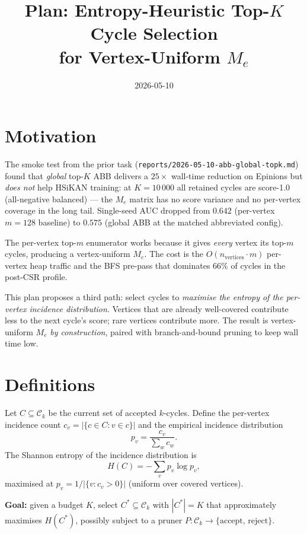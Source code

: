 \documentclass[a4paper,11pt]{article}
\title{Plan: Entropy-Heuristic Top-$K$ Cycle Selection\\for Vertex-Uniform $M_e$}
\author{}
\date{2026-05-10}
\begin{document}
\maketitle

\section*{Motivation}

The smoke test from the prior task
(\texttt{reports/2026-05-10-abb-global-topk.md}) found that
\emph{global} top-$K$ ABB delivers a $25\times$ wall-time reduction
on Epinions but \emph{does not} help HSiKAN training: at $K{=}10\,000$
all retained cycles are score-1.0 (all-negative balanced) — the
$M_e$ matrix has no score variance and no per-vertex coverage in the
long tail. Single-seed AUC dropped from $0.642$ (per-vertex $m{=}128$
baseline) to $0.575$ (global ABB at the matched abbreviated config).

The per-vertex top-$m$ enumerator works because it gives \emph{every}
vertex its top-$m$ cycles, producing a vertex-uniform $M_e$.  The cost
is the $O(n_{\text{vertices}} \cdot m)$ per-vertex heap traffic and
the BFS pre-pass that dominates $66\%$ of cycles in the post-CSR
profile.

This plan proposes a third path: select cycles to \emph{maximise
the entropy of the per-vertex incidence distribution}.  Vertices
that are already well-covered contribute less to the next cycle's
score; rare vertices contribute more.  The result is vertex-uniform
$M_e$ \emph{by construction}, paired with branch-and-bound pruning
to keep wall time low.

\section*{Definitions}

Let $C \subseteq \mathcal{C}_k$ be the current set of accepted
$k$-cycles.  Define the per-vertex incidence count
$c_v = |\{c \in C : v \in c\}|$ and the empirical incidence
distribution
\[
  p_v = \frac{c_v}{\sum_{w} c_w}.
\]
The Shannon entropy of the incidence distribution is
\[
  H(C) = -\sum_v p_v \log p_v,
\]
maximised at $p_v = 1 / |\{v : c_v > 0\}|$ (uniform over covered
vertices).

\textbf{Goal:} given a budget $K$, select $C^* \subseteq \mathcal{C}_k$
with $|C^*| = K$ that approximately maximises $H(C^*)$, possibly
subject to a pruner $P : \mathcal{C}_k \to \{\text{accept, reject}\}$.
\end{document}
